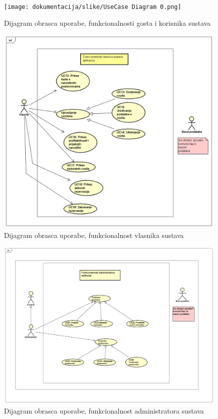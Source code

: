 				\begin{figure}[htb]
                    \centering
                    \texttt{[image: dokumentacija/slike/UseCase Diagram 0.png]}
                    \caption{Dijagram obrasca uporabe, funkcionalnosti gosta i korisnika sustava}
                    \label{fig:useCase-0}
                \end{figure}
				\begin{figure}[htb]
                    \centering
                    \includegraphics[width=15cm]{dokumentacija/slike/UseCaseDiagram1.png}
                    \caption{Dijagram obrasca uporabe, funkcionalnost vlasnika sustava}
                    \label{fig:useCase-1}
                \end{figure}
                \begin{figure}[htb]
                    \centering
                    \includegraphics[width=15cm]{dokumentacija/slike/UseCaseDiagram2.png}
                    \caption{Dijagram obrasca uporabe, funkcionalnost administratora sustava}
                    \label{fig:useCase-2}
                \end{figure}
                
